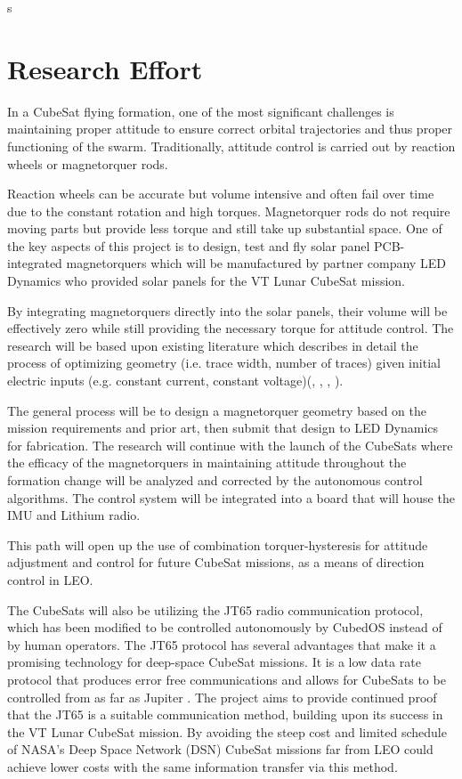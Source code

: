 s\section{Research Effort}

In a CubeSat flying formation, one of the most significant challenges
is maintaining proper attitude to ensure correct orbital trajectories
and thus proper functioning of the swarm. Traditionally, attitude
control is carried out by reaction wheels or magnetorquer
rods.

Reaction wheels can be accurate but volume intensive and often
fail over time due to the constant rotation and high
torques. Magnetorquer rods do not require moving parts but provide
less torque and still take up substantial space. One of the key
aspects of this project is to design, test and fly solar panel
PCB-integrated magnetorquers which will be manufactured by partner
company LED Dynamics who provided solar panels for the VT Lunar
CubeSat mission.

By integrating magnetorquers directly into the solar panels, their
volume will be effectively zero while still providing the necessary
torque for attitude control. The research will be based upon existing
literature which describes in detail the process of optimizing
geometry (i.e. trace width, number of traces) given initial electric
inputs (e.g. constant current, constant voltage)(\cite{ali:2021},
\cite{khan:2022}, \cite{sokal:2019}, \cite{sorensen:2021}).

 The general process will be to design a magnetorquer geometry based
 on the mission requirements and prior art, then submit that design to
 LED Dynamics for fabrication. The research will continue with the
 launch of the CubeSats where the efficacy of the magnetorquers in
 maintaining attitude throughout the formation change will be analyzed
 and corrected by the autonomous control algorithms. The control
 system will be integrated into a board that will house the IMU and
 Lithium radio.

This path will open up the use of combination torquer-hysteresis for
attitude adjustment and control for future CubeSat missions, as a
means of direction control in LEO.

The CubeSats will also be utilizing the JT65 radio communication
protocol, which has been modified to be controlled autonomously by
CubedOS instead of by human operators. The JT65 protocol has several
advantages that make it a promising technology for deep-space CubeSat
missions. It is a low data rate protocol that produces error free
communications and allows for CubeSats to be controlled from as far as
Jupiter \cite{brandon:2019}. The project aims to provide continued
proof that the JT65 is a suitable communication method, building upon
its success in the VT Lunar CubeSat mission. By avoiding the steep
cost and limited schedule of NASA’s Deep Space Network (DSN) CubeSat
missions far from LEO could achieve lower costs with the same
information transfer via this method.

